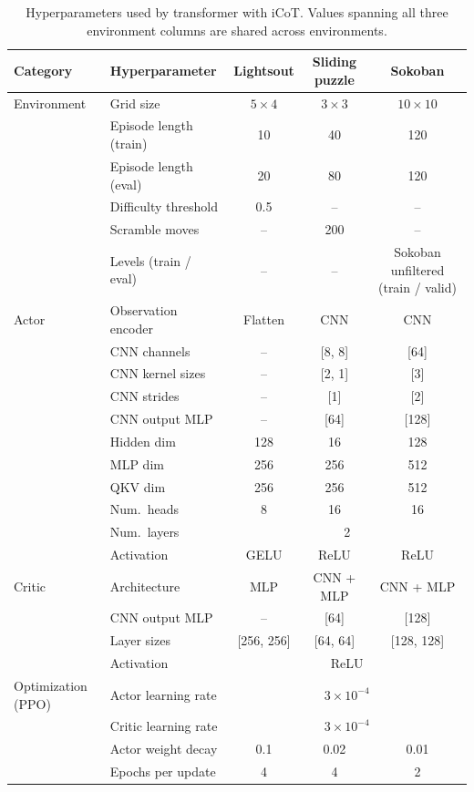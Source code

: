 \begin{table}[p]
\centering
\caption{
Hyperparameters used by transformer with iCoT. Values spanning all three environment columns are shared across environments.
}
\small
\begin{tabular}{llccc}
\toprule
Category & Hyperparameter & Lightsout & Sliding puzzle & Sokoban \\
\toprule
Environment
  & Grid size & $5\times4$ & $3\times3$ & $10\times10$ \\
  & Episode length (train) & 10 & 40 & 120 \\
  & Episode length (eval) & 20 & 80 & 120 \\
  & Difficulty threshold & 0.5 & -- & -- \\
  & Scramble moves & -- & 200 & -- \\
  & Levels (train / eval) & -- & -- & Sokoban unfiltered (train / valid) \\
\midrule
Actor
  & Observation encoder & Flatten & CNN & CNN \\
  & CNN channels & -- & [8, 8] & [64] \\
  & CNN kernel sizes & -- & [2, 1] & [3] \\
  & CNN strides & -- & [1] & [2] \\
  & CNN output MLP & -- & [64] & [128] \\
  & Hidden dim & 128 & 16 & 128 \\
  & MLP dim & 256 & 256 & 512 \\
  & QKV dim & 256 & 256 & 512 \\
  & Num.\ heads & 8 & 16 & 16 \\
  & Num.\ layers & \multicolumn{3}{c}{2} \\
  & Activation & GELU & ReLU & ReLU \\
\midrule
Critic
  & Architecture & MLP & CNN + MLP & CNN + MLP \\
  & CNN output MLP & -- & [64] & [128] \\
  & Layer sizes & [256, 256] & [64, 64] & [128, 128] \\
  & Activation & \multicolumn{3}{c}{ReLU} \\
\midrule
Optimization (PPO)
  & Actor learning rate & \multicolumn{3}{c}{$3\times10^{-4}$} \\
  & Critic learning rate & \multicolumn{3}{c}{$3\times10^{-4}$} \\
  & Actor weight decay & 0.1 & 0.02 & 0.01 \\
  & Epochs per update & 4 & 4 & 2 \\

\end{tabular}
\end{table}
